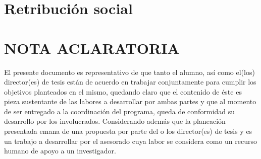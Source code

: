 \documentclass[runningheads,a4paper]{llncs}
\begin{document}
\section{Retribución social}


\section{NOTA ACLARATORIA}
El presente documento es representativo de que tanto el alumno, así como el(los) director(es) de tesis están de acuerdo en trabajar conjuntamente para cumplir los objetivos planteados en el mismo, quedando claro que el contenido de éste es pieza sustentante de las labores a desarrollar por ambas partes y que al momento de ser entregado a la coordinación del programa, queda de conformidad su desarrollo por los involucrados. Considerando además que la planeación presentada emana de una propuesta por parte del o los director(es) de tesis y es un trabajo a desarrollar por el asesorado cuya labor se considera como un recurso humano de apoyo a un investigador.


%
%
%
%
%
%
\end{document}

